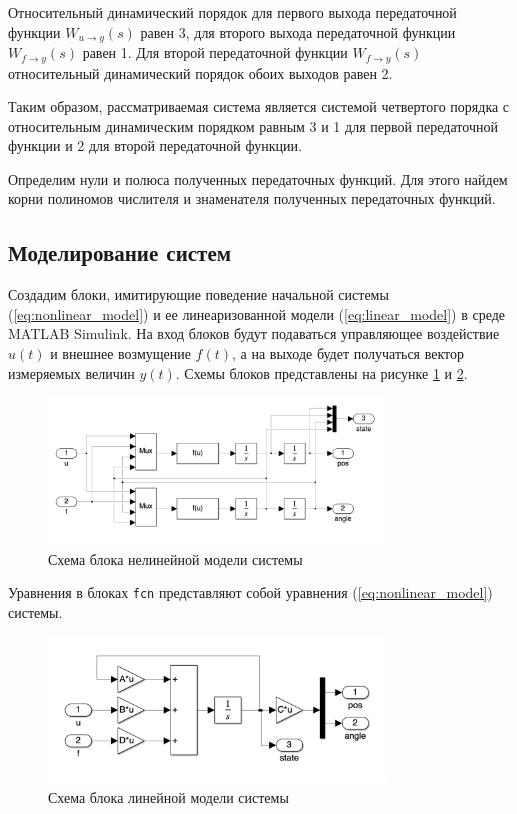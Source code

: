 Относительный динамический порядок для первого выхода передаточной функции $W_{u \rightarrow y}(s)$ равен 3, 
для второго выхода передаточной функции $W_{f \rightarrow y}(s)$ равен 1. 
Для второй передаточной функции $W_{f \rightarrow y}(s)$ относительный динамический порядок обоих выходов равен 2. 

Таким образом, рассматриваемая система является системой четвертого порядка с относительным динамическим порядком
равным 3 и 1 для первой передаточной функции и 2 для второй передаточной функции. 

Определим нули и полюса полученных передаточных функций. Для этого найдем корни полиномов числителя и знаменателя 
полученных передаточных функций. 


\subsection{Моделирование систем}
Создадим блоки, имитирующие поведение начальной системы (\ref{eq:nonlinear_model}) и ее линеаризованной модели (\ref{eq:linear_model})
в среде MATLAB Simulink. На вход блоков будут подаваться управляющее воздействие $u(t)$ и внешнее возмущение $f(t)$, 
а на выходе будет получаться вектор измеряемых величин $y(t)$. Схемы блоков представлены на рисунке \ref{fig:scheme_unlinear} и \ref{fig:scheme_linear}. 



\begin{figure}[ht!]
    \centering
    \includegraphics[width=0.8\textwidth]{media/scheme_unlinear.png}
    \caption{Схема блока нелинейной модели системы}
    \label{fig:scheme_unlinear}
\end{figure}
Уравнения в блоках \texttt{fcn} представляют собой уравнения (\ref{eq:nonlinear_model}) системы. 

\begin{figure}[ht!]
    \centering
    \includegraphics[width=0.8\textwidth]{media/scheme_linear.png}
    \caption{Схема блока линейной модели системы}
    \label{fig:scheme_linear}
\end{figure}

